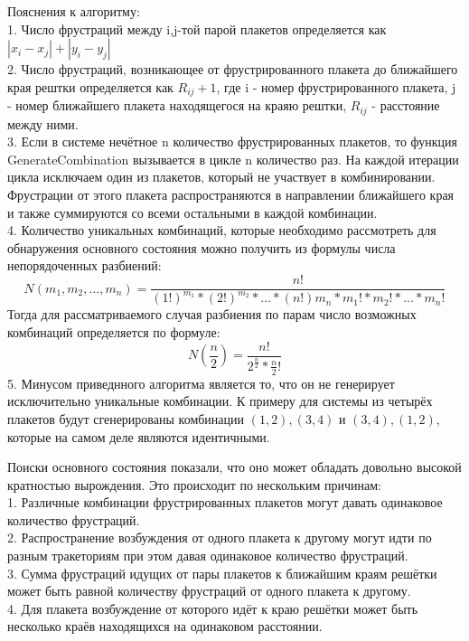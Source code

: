 \documentclass[utf8, babel, sor, jor, amsmath, amssymb, reprint]{elsarticle} %
\begin{document}
Пояснения к алгоритму:\\
1. Число фрустраций между i,j-той парой плакетов определяется как $\left|x_i-x_j\right|+\left|y_i-y_j\right|$\\
2. Число фрустраций, возникающее от фрустрированного плакета до ближайшего края рештки определяется как $R_{ij}+1$, где i - номер фрустрированного плакета, j - номер ближайшего плакета находящегося на краяю рештки, $R_{ij}$ - расстояние между ними.\\
3. Если в системе нечётное n количество фрустрированных плакетов, то функция GenerateCombination вызывается в цикле n количество раз. На каждой итерации цикла исключаем один из плакетов, который не участвует в комбинировании. Фрустрации от этого плакета распространяются в направлении ближайшего края и также суммируются со всеми остальными в каждой комбинации.\\
4. Количество уникальных комбинаций, которые необходимо рассмотреть для обнаружения основного состояния можно получить из формулы числа непорядоченных разбиений:
\begin{equation}
	N(m_1,m_2,...,m_n)=\dfrac{n!}{(1!)^{m_1}*(2!)^{m_2}*...*(n!){m_n}*m_1!*m_2!*...*m_n!}
	\label{eq:unordered_partitions}
\end{equation}
Тогда для рассматриваемого случая разбиения по парам число возможных комбинаций определяется по формуле:
\begin{equation}
	N(\frac{n}{2})=\dfrac{n!}{2^{\frac{n}{2}}*\frac{n}{2}!}
	\label{eq:unordered_partitions2}
\end{equation}
5. Минусом приведнного алгоритма является то, что он не генерирует исключительно уникальные комбинации. К примеру для системы из четырёх плакетов будут сгенерированы комбинации ${(1,2),(3,4)}$ и ${(3,4),(1,2)}$, которые на самом деле являются идентичными.

Поиски основного состояния показали, что оно может обладать довольно высокой кратностью вырождения. Это происходит по нескольким причинам:\\
1. Различные комбинации фрустрированных плакетов могут давать одинаковое количество фрустраций.\\
2. Распространение возбуждения от одного плакета к другому могут идти по разным тракеториям при этом давая одинаковое количество фрустраций.\\
3. Сумма фрустраций идущих от пары плакетов к ближайшим краям решётки может быть равной количеству фрустраций от одного плакета к другому.\\
4. Для плакета возбуждение от которого идёт к краю решётки может быть несколько краёв находящихся на одинаковом расстоянии.\\
\end{document}
